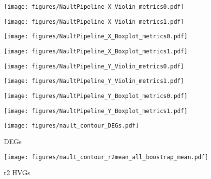 \clearpage


\begin{figure}[h!]
    \centering
    \texttt{[image: figures/NaultPipeline\_X\_Violin\_metrics0.pdf]}
\end{figure}

\begin{figure}[h!]
    \centering
    \texttt{[image: figures/NaultPipeline\_X\_Violin\_metrics1.pdf]}
\end{figure}

\clearpage

\begin{figure}[h!]
    \centering
    \texttt{[image: figures/NaultPipeline\_X\_Boxplot\_metrics0.pdf]}
\end{figure}

\begin{figure}[h!]
    \centering
    \texttt{[image: figures/NaultPipeline\_X\_Boxplot\_metrics1.pdf]}
\end{figure}

\clearpage

\begin{figure}[h!]
    \centering
    \texttt{[image: figures/NaultPipeline\_Y\_Violin\_metrics0.pdf]}
\end{figure}

\begin{figure}[h!]
    \centering
    \texttt{[image: figures/NaultPipeline\_Y\_Violin\_metrics1.pdf]}
\end{figure}

\clearpage

\begin{figure}[h!]
    \centering
    \texttt{[image: figures/NaultPipeline\_Y\_Boxplot\_metrics0.pdf]}
\end{figure}

\begin{figure}[h!]
    \centering
    \texttt{[image: figures/NaultPipeline\_Y\_Boxplot\_metrics1.pdf]}
\end{figure}

\clearpage

\begin{figure}[h!]
    \centering
    \texttt{[image: figures/nault\_contour\_DEGs.pdf]}
    \caption{DEGs}
\end{figure}

\begin{figure}[h!]
    \centering
    \texttt{[image: figures/nault\_contour\_r2mean\_all\_boostrap\_mean.pdf]}
    \caption{r2 HVGs}
\end{figure}

